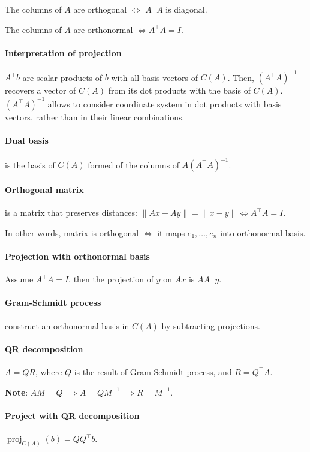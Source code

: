 \documentclass{article}
\begin{document}
The columns of $A$ are orthogonal $\iff$ $A^\top A$ is diagonal.

The columns of $A$ are orthonormal $\iff A^\top A = I$.

\paragraph{Interpretation of projection} $A^\top b$ are scalar products of $b$ with all basis vectors of $C(A)$. Then, $(A^\top A)^{-1}$ recovers a vector of $C(A)$ from its dot products with the basis of $C(A)$. $(A^\top A)^{-1}$ allows to consider coordinate system in dot products with basis vectors, rather than in their linear combinations.

\paragraph{Dual basis} is the basis of $C(A)$ formed of the columns of $A (A^\top A)^{-1}$.

\paragraph{Orthogonal matrix} is a matrix that preserves distances: $\|Ax-Ay\| = \|x-y\| \iff A^\top A = I$.

In other words, matrix is orthogonal $\iff$ it maps $e_1,\dots,e_n$ into orthonormal basis.

\paragraph{Projection with orthonormal basis} Assume $A^\top A = I$, then the projection of $y$ on $Ax$ is $A A^\top y$.

\paragraph{Gram-Schmidt process} construct an orthonormal basis in $C(A)$ by subtracting projections.

\paragraph{QR decomposition} $A=QR$, where $Q$ is the result of Gram-Schmidt process, and $R = Q^\top A$.

\textbf{Note}: $AM = Q \implies A = QM^{-1} \implies R = M^{-1}$.

\paragraph{Project with QR decomposition} $\operatorname{proj}_{C(A)} (b) = QQ^\top b$.
\end{document}
